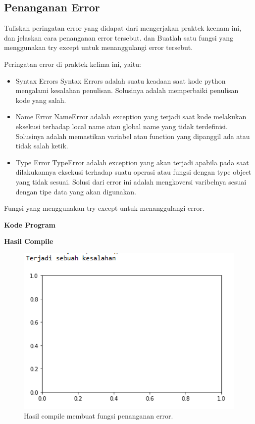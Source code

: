 \subsection{Penanganan Error}
Tuliskan  peringatan  error  yang  didapat  dari  mengerjakan  praktek  keenam  ini, dan  jelaskan  cara  penanganan  error  tersebut. dan  Buatlah  satu  fungsi  yang menggunakan try except untuk menanggulangi error tersebut.

\hfill \break
Peringatan error di praktek kelima ini, yaitu:
\begin{itemize}
	\item Syntax Errors
	Syntax Errors adalah suatu keadaan saat kode python mengalami kesalahan penulisan. Solusinya adalah memperbaiki penulisan kode yang salah.
	
	\item Name Error
	NameError adalah exception yang terjadi saat kode melakukan eksekusi terhadap local name atau global name yang tidak terdefinisi. Solusinya adalah memastikan variabel atau function yang dipanggil ada atau tidak salah ketik.
	
	\item Type Error
	TypeError adalah exception yang akan terjadi apabila pada saat dilakukannya eksekusi terhadap suatu operasi atau fungsi dengan type object yang tidak sesuai. Solusi dari error ini adalah mengkoversi varibelnya sesuai dengan tipe data yang akan digunakan.
\end{itemize}
\hfill \break
Fungsi yang menggunakan try except untuk menanggulangi error.

\hfill \break
\textbf{Kode Program}



\hfill \break
\textbf{Hasil Compile}

\begin{figure}[H]
	\includegraphics[width=12cm]{figures/6/Praktek/1174051/error.png}
	\centering
	\caption{Hasil compile membuat fungsi penanganan error.}
\end{figure}


